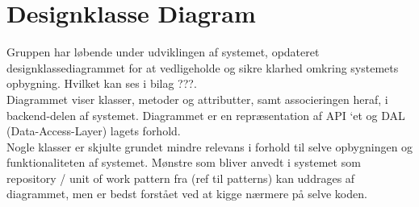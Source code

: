 \section{Designklasse Diagram}\label{Designklassediagram}
Gruppen har løbende under udviklingen af systemet, opdateret designklassediagrammet for at vedligeholde 
og sikre klarhed omkring systemets opbygning. Hvilket kan ses i bilag ???.\\
 
Diagrammet viser klasser, metoder og attributter, samt associeringen heraf, i backend-delen af systemet. 
Diagrammet er en repræsentation af API ‘et og DAL (Data-Access-Layer) lagets forhold.\\

Nogle klasser er skjulte grundet mindre relevans i forhold til selve opbygningen og funktionaliteten af systemet. 
Mønstre som bliver anvedt i systemet som repository / unit of work pattern fra (ref til patterns) 
kan uddrages af diagrammet, men er bedst forstået ved at kigge nærmere på selve koden.
